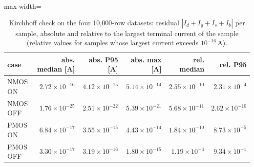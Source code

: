 \begin{table}[H]
\centering
{\small
\begin{adjustbox}{max width=\linewidth}
\begin{tabular}{lrrrrr}
\toprule
case & abs. median [A] & abs. P95 [A] & abs. max [A] & rel. median & rel. P95 \\
\midrule
NMOS ON & $2.72\times10^{-16}$ & $4.12\times10^{-15}$ & $5.14\times10^{-14}$ & $2.55\times10^{-10}$ & $2.31\times10^{-4}$ \\
NMOS OFF & $1.76\times10^{-25}$ & $2.51\times10^{-22}$ & $5.39\times10^{-21}$ & $5.68\times10^{-11}$ & $2.62\times10^{-10}$ \\
PMOS ON & $6.84\times10^{-17}$ & $3.55\times10^{-15}$ & $4.43\times10^{-14}$ & $1.84\times10^{-10}$ & $8.73\times10^{-5}$ \\
PMOS OFF & $3.30\times10^{-17}$ & $3.19\times10^{-16}$ & $1.80\times10^{-15}$ & $1.19\times10^{-3}$ & $9.34\times10^{-1}$ \\
\bottomrule
\end{tabular}
\end{adjustbox}
}
\caption{Kirchhoff check on the four 10{,}000-row datasets: residual $|I_d+I_g+I_s+I_b|$ per sample, absolute and relative to the largest terminal current of the sample (relative values for samples whose largest current exceeds $10^{-16}$\,A).}
\label{tab:kirchhoff}
\end{table}

